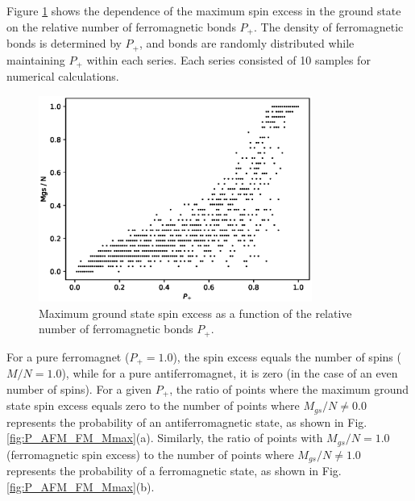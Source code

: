 \documentclass[utf8, babel, sor, jor, amsmath, amssymb, reprint]{elsarticle} %
\begin{document}
Figure \ref{fig:Mgs(P+)} shows the dependence of the maximum spin excess in the ground state on the relative number of ferromagnetic bonds $P_+$. The density of ferromagnetic bonds is determined by $P_+$, and bonds are randomly distributed while maintaining $P_+$ within each series. Each series consisted of 10 samples for numerical calculations.

\begin{figure}[H]
	\centering
	\includegraphics[width=0.8\textwidth]{images/Mgs(P+).eps}
	\caption{Maximum ground state spin excess as a function of the relative number of ferromagnetic bonds $P_+$.}
	\label{fig:Mgs(P+)}
\end{figure}

For a pure ferromagnet ($P_+ = 1.0$), the spin excess equals the number of spins ($M/N = 1.0$), while for a pure antiferromagnet, it is zero (in the case of an even number of spins). For a given $P_+$, the ratio of points where the maximum ground state spin excess equals zero to the number of points where $M_{gs}/N \neq 0.0$ represents the probability of an antiferromagnetic state, as shown in Fig. \ref{fig:P_AFM_FM_Mmax}(a). Similarly, the ratio of points with $M_{gs}/N = 1.0$ (ferromagnetic spin excess) to the number of points where $M_{gs}/N \neq 1.0$ represents the probability of a ferromagnetic state, as shown in Fig. \ref{fig:P_AFM_FM_Mmax}(b).
\end{document}

